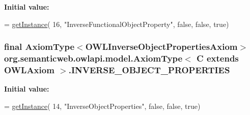 {\bfseries Initial value\-:}
\begin{DoxyCode}
= \hyperlink{classorg_1_1semanticweb_1_1owlapi_1_1model_1_1_axiom_type_3_01_c_01extends_01_o_w_l_axiom_01_4_a485e011845434c518471707a87f09339}{getInstance}(
            16, \textcolor{stringliteral}{"InverseFunctionalObjectProperty"}, \textcolor{keyword}{false}, \textcolor{keyword}{false}, \textcolor{keyword}{true})
\end{DoxyCode}
\hypertarget{classorg_1_1semanticweb_1_1owlapi_1_1model_1_1_axiom_type_3_01_c_01extends_01_o_w_l_axiom_01_4_a9d2f3a8df14a5045fbdc2f3bf6fe2403}{
\subsubsection[{I\-N\-V\-E\-R\-S\-E\-\_\-\-O\-B\-J\-E\-C\-T\-\_\-\-P\-R\-O\-P\-E\-R\-T\-I\-E\-S}]{\setlength{\rightskip}{0pt plus 5cm}final {\bf Axiom\-Type}$<${\bf O\-W\-L\-Inverse\-Object\-Properties\-Axiom}$>$ org.\-semanticweb.\-owlapi.\-model.\-Axiom\-Type$<$ C extends {\bf O\-W\-L\-Axiom} $>$.I\-N\-V\-E\-R\-S\-E\-\_\-\-O\-B\-J\-E\-C\-T\-\_\-\-P\-R\-O\-P\-E\-R\-T\-I\-E\-S\hspace{0.3cm}{\ttfamily [static]}}}\label{classorg_1_1semanticweb_1_1owlapi_1_1model_1_1_axiom_type_3_01_c_01extends_01_o_w_l_axiom_01_4_a9d2f3a8df14a5045fbdc2f3bf6fe2403}
{\bfseries Initial value\-:}
\begin{DoxyCode}
= \hyperlink{classorg_1_1semanticweb_1_1owlapi_1_1model_1_1_axiom_type_3_01_c_01extends_01_o_w_l_axiom_01_4_a485e011845434c518471707a87f09339}{getInstance}(
            14, \textcolor{stringliteral}{"InverseObjectProperties"}, \textcolor{keyword}{false}, \textcolor{keyword}{false}, \textcolor{keyword}{true})
\end{DoxyCode}
